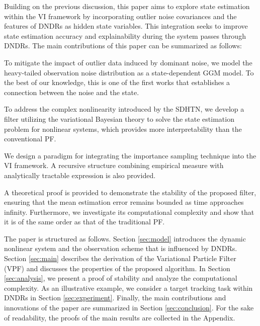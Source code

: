 \documentclass[10pt,twocolumn,twoside]{IEEEtran}
\begin{document}
Building on the previous discussion, this paper aims to explore state estimation within the VI framework by incorporating outlier noise covariances and the features of DNDRs as hidden state variables. This integration seeks to improve state estimation accuracy and explainability during the system passes through DNDRs. The main contributions of this paper can be summarized as follows:
\begin{enumerate}{\it
    \item To mitigate the impact of outlier data induced by dominant noise, we model the heavy-tailed observation noise distribution as a state-dependent GGM model. To the best of our knowledge, this is one of the first works that establishes a connection between the noise and the state.
    \item To address the complex nonlinearity introduced by the SDHTN, we develop a filter utilizing the variational Bayesian theory to solve the state estimation problem for nonlinear systems, which provides more interpretability than the conventional PF.
    \item We design a paradigm for integrating the importance sampling technique into the VI framework. A recursive structure combining empirical measure with analytically tractable expression is also provided. 
    \item A theoretical proof is provided to demonstrate the stability of the proposed filter, ensuring that the mean estimation error remains bounded as time approaches infinity. Furthermore, we investigate its computational complexity and show that it is of the same order as that of the traditional PF.}
\end{enumerate}

The paper is structured as follows.
Section \ref{sec:model} introduces the dynamic nonlinear system and the observation scheme that is influenced by DNDRs. 
Section \ref{sec:main} describes the derivation of the Variational Particle Filter (VPF) and discusses the properties of the proposed algorithm.
In Section \ref{sec:analysis}, we present a proof of stability and analyze the computational complexity.
As an illustrative example, we consider a target tracking task within DNDRs in Section \ref{sec:experiment}.
Finally, the main contributions and innovations of the paper are summarized in Section \ref{sec:conclusion}.
For the sake of readability, the proofs of the main results are collected in the Appendix.
\end{document}
